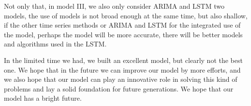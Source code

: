 \documentclass[12pt]{article}  %
\begin{document}
Not only that, in model III, we also only consider ARIMA and LSTM two models, the use of models is not broad enough at the same time, but also shallow, if the other time series methods or ARIMA and LSTM for the integrated use of the model, perhaps the model will be more accurate, there will be better models and algorithms used in the LSTM.

In the limited time we had, we built an excellent model, but clearly not the best one. We hope that in the future we can improve our model by more efforts, and we also hope that our model can play an innovative role in solving this kind of problems and lay a solid foundation for future generations. We hope that our model has a bright future.

\newpage

\vspace*{0.5cm}

\newpage
\end{document}
